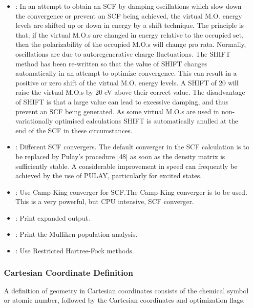 \documentclass[11pt]{JHEP3}
\begin{document}
\begin{itemize}
\item {}: In an attempt to obtain an SCF by damping 
oscillations which slow down the convergence or prevent an SCF being 
achieved, the virtual M.O. energy levels are shifted up or down in 
energy by a shift technique. The principle is that, if the virtual 
M.O.s are changed in energy relative to the occupied set, then the 
polarizability of the occupied M.O.s will change pro rata. Normally, 
oscillations are due to autoregenerative charge fluctuations. The 
SHIFT method has been re-written so that the value of SHIFT changes 
automatically in an attempt to optimize convergence. This can result 
in a positive or zero shift of the virtual M.O. energy levels. A 
SHIFT of 20 will raise the virtual M.O.s by 20 eV above their 
correct value. The disadvantage of SHIFT is that a large value can 
lead to excessive damping, and thus prevent an SCF being generated. 
As some virtual M.O.s are used in non-variationally optimised 
calculations SHIFT is automatically anulled at the end of the SCF in 
these circumstances. 

\item {}: Different SCF convergers. The default converger 
in the SCF calculation is to be replaced by Pulay's procedure [48] 
as soon as the density matrix is sufficiently stable.   A 
considerable improvement in speed can frequently be achieved by the 
use of PULAY, particularly for excited states. 

\item {}: Use Camp-King converger for SCF.The
Camp-King converger is to be used. This is a very powerful, but CPU
intensive, SCF converger.

\item {}: Print expanded output.

\item {}: Print the Mulliken population analysis.

\item {}: Use Restricted Hartree-Fock methods.
\end{itemize}

\subsubsection*{Cartesian Coordinate Definition}

A definition of geometry in Cartesian coordinates consists of the
chemical symbol or atomic number, followed by the Cartesian
coordinates and optimization flags.
\end{document}
